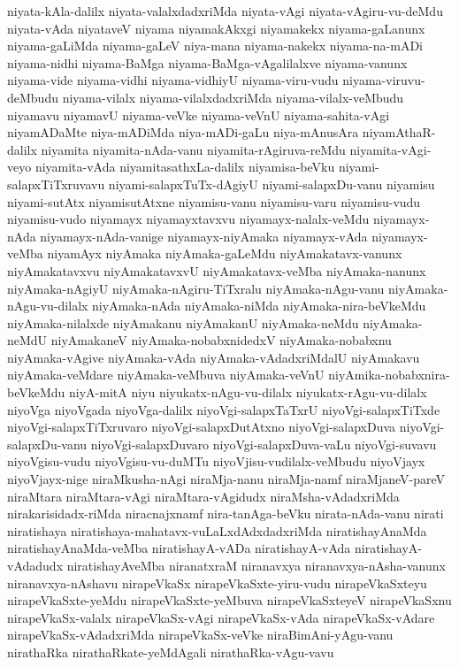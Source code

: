 {niyata-kAla-dalilx
niyata-valalxdadxriMda
niyata-vAgi
niyata-vAgiru-vu-deMdu
niyata-vAda
niyataveV
niyama
niyamakAkxgi
niyamakekx
niyama-gaLanunx
niyama-gaLiMda
niyama-gaLeV
niya-mana
niyama-nakekx
niyama-na-mADi
niyama-nidhi
niyama-BaMga
niyama-BaMga-vAgalilalxve
niyama-vanunx
niyama-vide
niyama-vidhi
niyama-vidhiyU
niyama-viru-vudu
niyama-viruvu-deMbudu
niyama-vilalx
niyama-vilalxdadxriMda
niyama-vilalx-veMbudu
niyamavu
niyamavU
niyama-veVke
niyama-veVnU
niyama-sahita-vAgi
niyamADaMte
niya-mADiMda
niya-mADi-gaLu
niya-mAnusAra
niyamAthaR-dalilx
niyamita
niyamita-nAda-vanu
niyamita-rAgiruva-reMdu
niyamita-vAgi-veyo
niyamita-vAda
niyamitasathxLa-dalilx
niyamisa-beVku
niyami-salapxTiTxruvavu
niyami-salapxTuTx-dAgiyU
niyami-salapxDu-vanu
niyamisu
niyami-sutAtx
niyamisutAtxne
niyamisu-vanu
niyamisu-varu
niyamisu-vudu
niyamisu-vudo
niyamayx
niyamayxtavxvu
niyamayx-nalalx-veMdu
niyamayx-nAda
niyamayx-nAda-vanige
niyamayx-niyAmaka
niyamayx-vAda
niyamayx-veMba
niyamAyx
niyAmaka
niyAmaka-gaLeMdu
niyAmakatavx-vanunx
niyAmakatavxvu
niyAmakatavxvU
niyAmakatavx-veMba
niyAmaka-nanunx
niyAmaka-nAgiyU
niyAmaka-nAgiru-TiTxralu
niyAmaka-nAgu-vanu
niyAmaka-nAgu-vu-dilalx
niyAmaka-nAda
niyAmaka-niMda
niyAmaka-nira-beVkeMdu
niyAmaka-nilalxde
niyAmakanu
niyAmakanU
niyAmaka-neMdu
niyAmaka-neMdU
niyAmakaneV
niyAmaka-nobabxnidedxV
niyAmaka-nobabxnu
niyAmaka-vAgive
niyAmaka-vAda
niyAmaka-vAdadxriMdalU
niyAmakavu
niyAmaka-veMdare
niyAmaka-veMbuva
niyAmaka-veVnU
niyAmika-nobabxnira-beVkeMdu
niyA-mitA
niyu
niyukatx-nAgu-vu-dilalx
niyukatx-rAgu-vu-dilalx
niyoVga
niyoVgada
niyoVga-dalilx
niyoVgi-salapxTaTxrU
niyoVgi-salapxTiTxde
niyoVgi-salapxTiTxruvaro
niyoVgi-salapxDutAtxno
niyoVgi-salapxDuva
niyoVgi-salapxDu-vanu
niyoVgi-salapxDuvaro
niyoVgi-salapxDuva-vaLu
niyoVgi-suvavu
niyoVgisu-vudu
niyoVgisu-vu-duMTu
niyoVjisu-vudilalx-veMbudu
niyoVjayx
niyoVjayx-nige
niraMkusha-nAgi
niraMja-nanu
niraMja-namf
niraMjaneV-pareV
niraMtara
niraMtara-vAgi
niraMtara-vAgidudx
niraMsha-vAdadxriMda
nirakarisidadx-riMda
niracnajxnamf
nira-tanAga-beVku
nirata-nAda-vanu
nirati
niratishaya
niratishaya-mahatavx-vuLaLxdAdxdadxriMda
niratishayAnaMda
niratishayAnaMda-veMba
niratishayA-vADa
niratishayA-vAda
niratishayA-vAdadudx
niratishayAveMba
niranatxraM
niranavxya
niranavxya-nAsha-vanunx
niranavxya-nAshavu
nirapeVkaSx
nirapeVkaSxte-yiru-vudu
nirapeVkaSxteyu
nirapeVkaSxte-yeMdu
nirapeVkaSxte-yeMbuva
nirapeVkaSxteyeV
nirapeVkaSxnu
nirapeVkaSx-valalx
nirapeVkaSx-vAgi
nirapeVkaSx-vAda
nirapeVkaSx-vAdare
nirapeVkaSx-vAdadxriMda
nirapeVkaSx-veVke
niraBimAni-yAgu-vanu
nirathaRka
nirathaRkate-yeMdAgali
nirathaRka-vAgu-vavu
}

